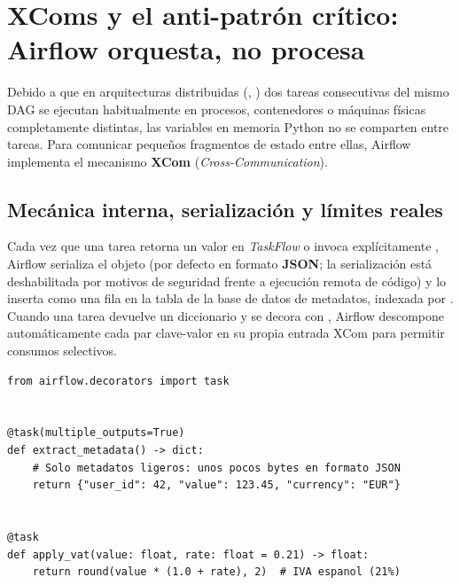 \section{XComs y el anti-patrón crítico: Airflow orquesta, no procesa}\label{sec:xcoms-antipatron}

Debido a que en arquitecturas distribuidas (, ) dos tareas consecutivas del mismo DAG se ejecutan habitualmente en procesos, contenedores o máquinas físicas completamente distintas, las variables en memoria Python no se comparten entre tareas. Para comunicar pequeños fragmentos de estado entre ellas, Airflow implementa el mecanismo \textbf{XCom} (\textit{Cross-Communication}).

\subsection{Mecánica interna, serialización y límites reales}

Cada vez que una tarea retorna un valor en \textit{TaskFlow} o invoca explícitamente , Airflow serializa el objeto (por defecto en formato \textbf{JSON}; la serialización  está deshabilitada por motivos de seguridad frente a ejecución remota de código) y lo inserta como una fila en la tabla  de la base de datos de metadatos, indexada por . Cuando una tarea devuelve un diccionario y se decora con , Airflow descompone automáticamente cada par clave-valor en su propia entrada XCom para permitir consumos selectivos.

\begin{lstlisting}[style=python, caption={Paso correcto de metadatos ligeros mediante XCom en TaskFlow API.}, label={lst:xcom-ligero}]
from airflow.decorators import task


@task(multiple_outputs=True)
def extract_metadata() -> dict:
    # Solo metadatos ligeros: unos pocos bytes en formato JSON
    return {"user_id": 42, "value": 123.45, "currency": "EUR"}


@task
def apply_vat(value: float, rate: float = 0.21) -> float:
    return round(value * (1.0 + rate), 2)  # IVA espanol (21%)
\end{lstlisting}

